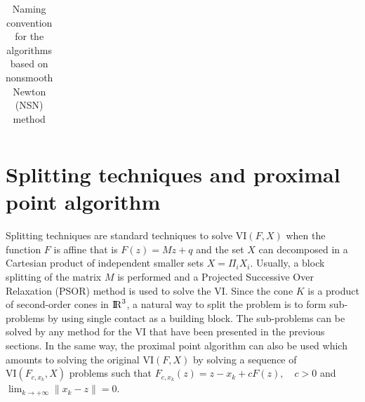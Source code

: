 \begin{table}[htbp]
\begin{tabular}{|l|l|p{}|}
  \end{tabular}
  \caption{Naming convention for the algorithms based on nonsmooth Newton (NSN) method}
  \label{tab:NSN-algos}
\end{table}






\section{Splitting techniques and proximal point algorithm}
\label{Sec:SplittingTechniquesAndProx}

Splitting techniques are standard techniques to solve $\mathrm{VI}(F,X)$ when the function $F$ is affine that is $F(z) = Mz+q$ and the set $X$ can decomposed in a Cartesian product of independent smaller sets $X = \Pi_{i} X_i$.
Usually, a block splitting of the matrix $M$ is performed and a Projected Successive Over Relaxation (PSOR) method is used to solve the VI. Since the cone $K$ is a product of second-order cones in $\mathrm{I\!R}^3$, a natural way to split the problem is to form sub-problems by using single contact as a building block. The sub-problems can be solved by any method for the VI that have been presented in the previous sections. In the same way, the proximal point algorithm can also be used which amounts to solving the original $\mathrm{VI}(F,X)$ by solving a sequence of $\mathrm{VI}(F_{c,x_k},X)$  problems such that $  F_{c,x_k}(z) = z - x_k + c F(z) , \quad c > 0$ and $\lim_ {k \rightarrow +\infty } \|x_k-z\| =0$.


